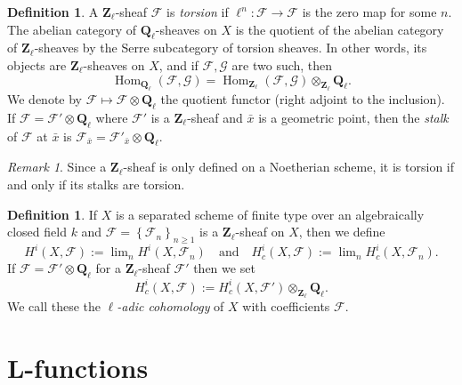 \documentclass{stacks-project}
\theoremstyle{plain}
\theoremstyle{definition}
\newtheorem{definition}[subsection]{Definition}
\theoremstyle{remark}
\newtheorem{remark}[subsection]{Remark}
\numberwithin{equation}{subsection}
\def\lim{\mathop{\mathrm{lim}}\nolimits}
\def\Hom{\mathop{\mathrm{Hom}}\nolimits}
\begin{document}
\begin{definition}
\label{definition-torsion-l-adic-sheaf}
A $\mathbf{Z}_\ell$-sheaf $\mathcal{F}$ is {\it torsion} if
$\ell^n : \mathcal{F} \to \mathcal{F}$ is the zero map for some $n$.
The abelian category
of $\mathbf{Q}_\ell$-sheaves on $X$ is the quotient of the abelian category of
$\mathbf{Z}_\ell$-sheaves by the Serre subcategory of torsion sheaves. In
other words, its objects are $\mathbf{Z}_\ell$-sheaves on $X$, and if
$\mathcal{F}, \mathcal{G}$ are two such, then
$$
\Hom_{\mathbf{Q}_\ell} \left(\mathcal{F}, \mathcal{G} \right) =
\Hom_{\mathbf{Z}_\ell} \left(\mathcal{F}, \mathcal{G}\right)
\otimes_{\mathbf{Z}_\ell} \mathbf{Q}_\ell.
$$
We denote by $\mathcal{F} \mapsto \mathcal{F} \otimes \mathbf{Q}_\ell$ the
quotient functor (right adjoint to the inclusion). If $\mathcal{F} =
\mathcal{F}' \otimes \mathbf{Q}_\ell$ where $\mathcal{F}'$ is a
$\mathbf{Z}_\ell$-sheaf and $\bar x$ is a geometric point, then the
{\it stalk} of $\mathcal{F}$ at $\bar x$ is $\mathcal{F}_{\bar x} =
\mathcal{F}'_{\bar x} \otimes \mathbf{Q}_\ell$.
\end{definition}

\begin{remark}
\label{remark-torsion-stalks}
Since a $\mathbf{Z}_\ell$-sheaf is only defined on a Noetherian scheme, it is
torsion if and only if its stalks are torsion.
\end{remark}

\begin{definition}
\label{definition-cohomology-l-adic}
If $X$ is a separated scheme of finite type over an algebraically closed field
$k$ and $\mathcal{F} = \left\{\mathcal{F}_n\right\}_{n\geq 1}$ is a
$\mathbf{Z}_\ell$-sheaf on $X$, then we define
$$
H^i(X, \mathcal{F}) := \lim_n H^i(X, \mathcal{F}_n)
\quad\text{and}\quad
H_c^i(X, \mathcal{F}) := \lim_n H_c^i(X, \mathcal{F}_n).
$$
If $\mathcal{F} = \mathcal{F}'\otimes \mathbf{Q}_\ell$ for a
$\mathbf{Z}_\ell$-sheaf $\mathcal{F}'$ then we set
$$
H_c^i(X , \mathcal{F}) := H_c^i(X,
\mathcal{F}')\otimes_{\mathbf{Z}_\ell}\mathbf{Q}_\ell.
$$
We call these the {\it $\ell$-adic cohomology} of $X$ with coefficients
$\mathcal{F}$.
\end{definition}





\section{L-functions}
\label{section-L-function}
\end{document}
